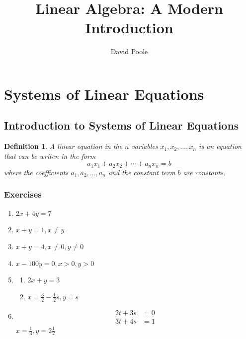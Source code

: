 \documentclass{article}
\title{Linear Algebra: A Modern Introduction}
\author{David Poole}
\date{}
\newtheorem*{definition*}{Definition}
\begin{document}
\maketitle
\setcounter{section}{1}
\section{Systems of Linear Equations}

\subsection{Introduction to Systems of Linear Equations}
\begin{definition*}
  A linear equation in the $n$ variables $x_1, x_2, \ldots, x_n$ is an equation that can be writen
  in the form
  \[a_1x_1+a_2x_2+\cdots+a_nx_n=b\]
  where the coefficients $a_1, a_2, \ldots, a_n$ and the constant term $b$ are constants.
\end{definition*}
\subsubsection*{Exercises}
\begin{enumerate}
  \item $2x+4y=7$
  \item $x+y=1, x \ne y$
  \item $x+y=4, x\ne0, y\ne0$
  \item $x-100y=0, x>0, y>0$
    \setcounter{enumi}{38}
  \item
    \begin{enumerate}
      \item $2x+y=3$
      \item $x=\frac{3}{2}-\frac{1}{2}s, y=s$
    \end{enumerate}
    \setcounter{enumi}{40}
  \item
    \begin{align*}
      2t+3s & = 0 \\
      3t+4s & = 1
    \end{align*}
    $x=\frac{1}{3},y=2\frac{1}{2}$
\end{enumerate}
\end{document}
